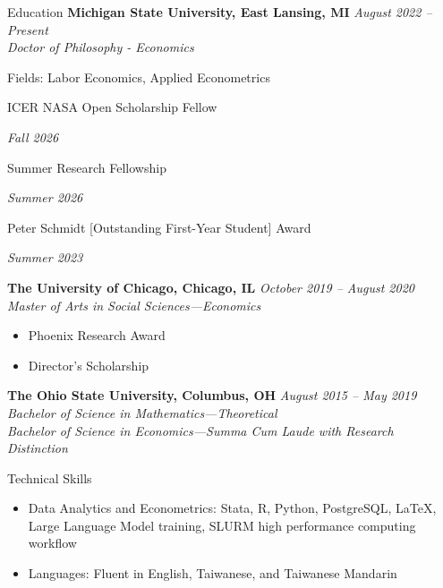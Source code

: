 \documentclass{resume} %
\begin{document}
\begin{rSection}{Education}
\vspace{-0.15cm}
{\textbf{Michigan State University, East Lansing, MI} } \hfill {\em August 2022 – Present} 
\\{\textit {Doctor of Philosophy - Economics }}
\begin{itemize}
\vspace{-0.25cm}
    \item Fields: Labor Economics, Applied Econometrics
    {\item ICER NASA Open Scholarship Fellow}\hfill{\em Fall 2026}
    {\item Summer Research Fellowship}\hfill{\em Summer 2026}
    {\item Peter Schmidt [Outstanding First-Year Student] Award}\hfill{\em Summer 2023}
\end{itemize}
\vspace{-0.1cm}
{\textbf{The University of Chicago, Chicago, IL} } \hfill {\em October 2019 – August 2020} 
\\{\textit {Master of Arts in Social Sciences---Economics }} 
\begin{itemize}
\vspace{-0.25cm}
    \item Phoenix Research Award
    \item Director's Scholarship
\end{itemize}
\vspace{-0.1cm}
{\bf The Ohio State University, Columbus, OH} \hfill {\em August 2015 – May 2019} 
\\{\textit {Bachelor of Science in Mathematics---Theoretical}} 
\\{\textit {Bachelor of Science in Economics---Summa Cum Laude with Research Distinction}} 

\end{rSection}

\begin{rSection}{Technical Skills}
\begin{itemize}
    \item Data Analytics and Econometrics: Stata, R, Python, PostgreSQL, \LaTeX, Large Language Model training, SLURM high performance computing workflow
    \item Languages: Fluent in English, Taiwanese, and Taiwanese Mandarin
\end{itemize}
\end{rSection}
\end{document}
